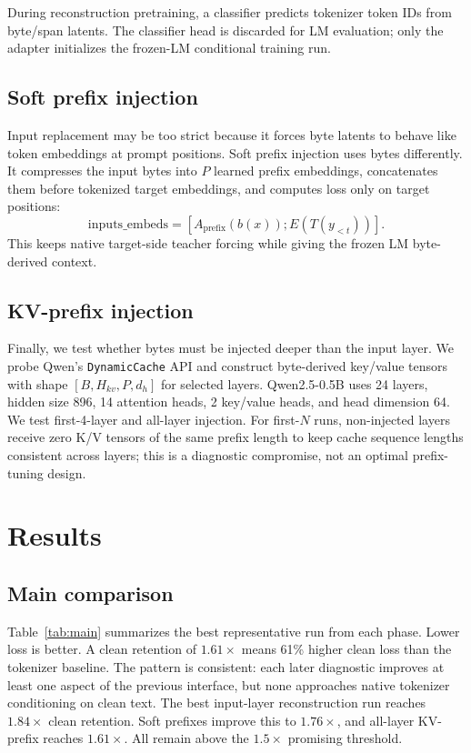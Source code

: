 \documentclass{article}
\begin{document}
During reconstruction pretraining, a classifier predicts tokenizer token IDs from byte/span latents. The classifier head is discarded for LM evaluation; only the adapter initializes the frozen-LM conditional training run.

\subsection{Soft prefix injection}

Input replacement may be too strict because it forces byte latents to behave like token embeddings at prompt positions. Soft prefix injection uses bytes differently. It compresses the input bytes into $P$ learned prefix embeddings, concatenates them before tokenized target embeddings, and computes loss only on target positions:
\begin{equation}
    \mathrm{inputs\_embeds} = [A_{\mathrm{prefix}}(b(x)); E(T(y_{<t}))].
\end{equation}
This keeps native target-side teacher forcing while giving the frozen LM byte-derived context.

\subsection{KV-prefix injection}

Finally, we test whether bytes must be injected deeper than the input layer. We probe Qwen's \texttt{DynamicCache} API and construct byte-derived key/value tensors with shape $[B, H_{kv}, P, d_h]$ for selected layers. Qwen2.5-0.5B uses 24 layers, hidden size 896, 14 attention heads, 2 key/value heads, and head dimension 64. We test first-4-layer and all-layer injection. For first-$N$ runs, non-injected layers receive zero K/V tensors of the same prefix length to keep cache sequence lengths consistent across layers; this is a diagnostic compromise, not an optimal prefix-tuning design.

\section{Results}

\subsection{Main comparison}

Table~\ref{tab:main} summarizes the best representative run from each phase. Lower loss is better. A clean retention of $1.61\times$ means 61\% higher clean loss than the tokenizer baseline. The pattern is consistent: each later diagnostic improves at least one aspect of the previous interface, but none approaches native tokenizer conditioning on clean text. The best input-layer reconstruction run reaches $1.84\times$ clean retention. Soft prefixes improve this to $1.76\times$, and all-layer KV-prefix reaches $1.61\times$. All remain above the $1.5\times$ promising threshold.
\end{document}
